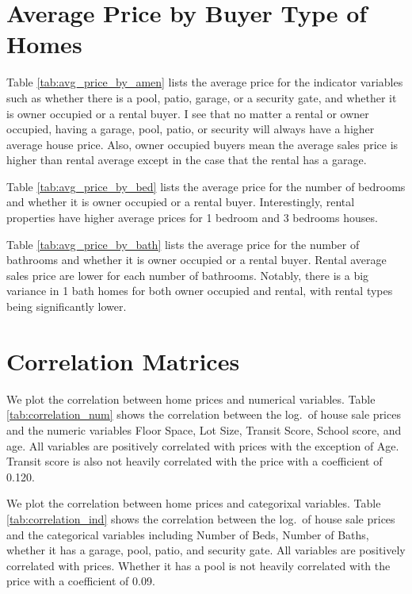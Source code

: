 

\pagebreak
\section{Average Price by Buyer Type of Homes}

Table \ref{tab:avg_price_by_amen} lists the average price for the indicator variables such as whether there is a pool, patio, garage, or a security gate, and whether it is owner occupied or a rental buyer.  I see that no matter a rental or owner occupied, having a garage, pool, patio, or security will always have a higher average house price. Also, owner occupied buyers mean the average sales price is higher than rental average except in the case that the rental has a garage.


\medskip
Table \ref{tab:avg_price_by_bed} lists the average price for the number of bedrooms and whether it is owner occupied or a rental buyer.  Interestingly, rental properties have higher average prices for 1 bedroom and 3 bedrooms houses.


\medskip
Table \ref{tab:avg_price_by_bath} lists the average price for the number of bathrooms and whether it is owner occupied or a rental buyer.  Rental average sales price are lower for each number of bathrooms. Notably, there is a big variance in 1 bath homes for both owner occupied and rental, with rental types being significantly lower.








\pagebreak
\section{Correlation Matrices}
We plot the correlation between home prices and numerical variables. 
Table \ref{tab:correlation_num} shows the correlation 
between the log.~of house sale prices
and the numeric variables Floor Space, Lot Size, Transit Score, School score, and age.%
All variables are positively correlated with prices with the exception of Age. Transit score is also not heavily correlated with the price with a coefficient of 0.120.


% 


We plot the correlation between home prices and categorixal variables. 
Table \ref{tab:correlation_ind} shows the correlation 
between the log.~of house sale prices
and the categorical variables including Number of Beds, Number of Baths, whether it has a garage, pool, patio, and security gate.
All variables are positively correlated with prices. Whether it has a pool is not heavily correlated with the price with a coefficient of 0.09.








%

